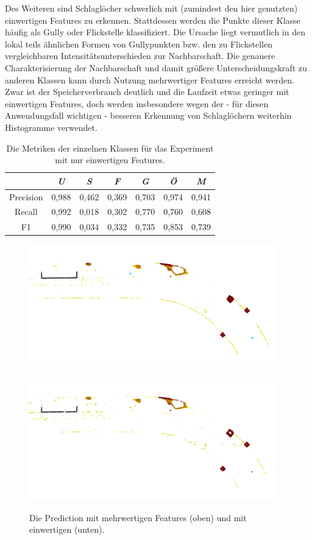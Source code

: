 Des Weiteren sind Schlaglöcher schwerlich mit (zumindest den hier genutzten) einwertigen Features zu erkennen. Stattdessen werden die Punkte dieser Klasse häufig als Gully oder Flickstelle klassifiziert. Die Ursache liegt vermutlich in den lokal teils ähnlichen Formen von Gullypunkten bzw. den zu Flickstellen vergleichbaren Intensitätsunterschieden zur Nachbarschaft. Die genauere Charakterisierung der Nachbarschaft und damit größere Unterscheidungskraft zu anderen Klassen kann durch Nutzung mehrwertiger Features erreicht werden. Zwar ist der Speicherverbrauch deutlich und die Laufzeit etwas geringer mit einwertigen Features, doch werden insbesondere wegen der - für diesen Anwendungsfall wichtigen - besseren Erkennung von Schlaglöchern weiterhin Histogramme verwendet.

\begin{table}
\centering
\begin{tabular}{c|c|c|c|c|c|c}
 & \textit{U} & \textit{S} & \textit{F} & \textit{G} & \textit{Ö} & \textit{M} \\
\hline
Precision & 0,988 & 0,462 & 0,369 & 0,703 & 0,974 & 0,941 \\
Recall    & 0,992 & 0,018 & 0,302 & 0,770 & 0,760 & 0,608 \\
F1        & 0,990 & 0,034 & 0,332 & 0,735 & 0,853 & 0,739 \\
\end{tabular}
\caption{Die Metriken der einzelnen Klassen für das Experiment mit nur einwertigen Features.}
\label{table:absolute_value_metrics}
\end{table}

\begin{figure}
    {\includegraphics[width=0.95\textwidth]{graphics/eval_right_prediction}}
    \par\smallskip
    {\includegraphics[width=0.95\textwidth]{graphics/eval_right_absolute}}
    \caption{Die Prediction mit mehrwertigen Features (oben) und mit einwertigen (unten).}
    \label{fig:cmp_absolute_full}
\end{figure}

